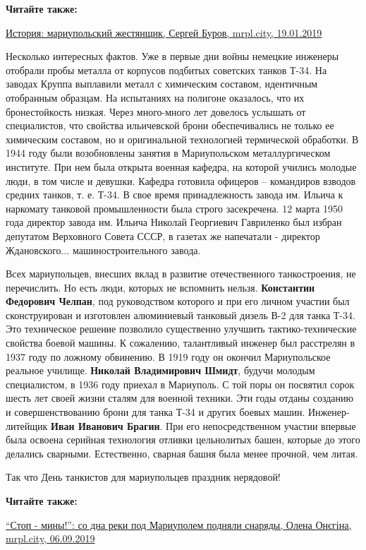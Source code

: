 \vspace{0.5cm}
\begin{minipage}{0.9\textwidth}
\textbf{Читайте также:}

\href{https://archive.org/details/19_01_2019.sergij_burov.mrpl_city.istoria_mariupolskij_zhestjanschik}{%
История: мариупольский жестянщик, Сергей Буров, mrpl.city, 19.01.2019}
\end{minipage}
\vspace{0.5cm}

Несколько интересных фактов. Уже в первые дни войны немецкие инженеры отобрали
пробы металла от корпусов подбитых советских танков Т-34. На заводах Круппа
выплавили металл с химическим составом, идентичным отобранным образцам. На
испытаниях на полигоне оказалось, что их бронестойкость низкая. Через
много-много лет довелось услышать от специалистов, что свойства ильичевской
брони обеспечивались не только ее химическим составом, но и оригинальной
технологией термической обработки. В 1944 году были возобновлены занятия в
Мариупольском металлургическом институте. При нем была открыта военная кафедра,
на которой учились молодые люди, в том числе и девушки. Кафедра готовила
офицеров – командиров взводов средних танков, т. е. Т-34. В свое время
принадлежность завода им. Ильича к наркомату танковой промышленности была
строго засекречена. 12 марта 1950 года директор завода им. Ильича Николай
Георгиевич Гавриленко был избран депутатом Верховного Совета СССР, в газетах же
напечатали - директор Ждановского... машиностроительного завода.

Всех мариупольцев, внесших вклад в развитие отечественного танкостроения, не
перечислить. Но есть люди, которых не вспомнить нельзя. \textbf{Константин Федорович
Челпан}, под руководством которого и при его личном участии был сконструирован и
изготовлен алюминиевый танковый дизель В-2 для танка Т-34. Это техническое
решение позволило существенно улучшить тактико-технические свойства боевой
машины. К сожалению, талантливый инженер был расстрелян в 1937 году по ложному
обвинению. В 1919 году он окончил Мариупольское реальное училище. \textbf{Николай
Владимирович Шмидт}, будучи молодым специалистом, в 1936 году приехал в
Мариуполь. С той поры он посвятил сорок шесть лет своей жизни сталям для
военной техники. Эти годы отданы созданию и совершенствованию брони для танка
Т-34 и других боевых машин. Инженер-литейщик \textbf{Иван Иванович Брагин}. При его
непосредственном участии  впервые была освоена серийная технология отливки
цельнолитых башен, которые до этого делались сварными. Естественно, сварная
башня была менее прочной, чем литая.

Так что День танкистов для мариупольцев праздник нерядовой!

\textbf{Читайте также:} 

\href{https://mrpl.city/news/view/stop-miny-so-dna-reki-pod-mariupolem-podnyali-snaryady-foto-plusvideo-1}{%
\enquote{Стоп - мины!}: со дна реки под Мариуполем подняли снаряды, Олена Онєгіна, mrpl.city, 06.09.2019}
